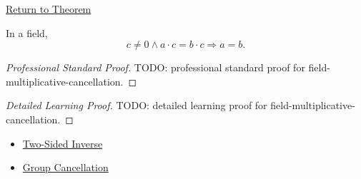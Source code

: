 \newpage
{}
\label{prf:field-multiplicative-cancellation}

\begin{remark*}[Return]
\hyperref[thm:field-multiplicative-cancellation]{Return to Theorem}
\end{remark*}

\begin{theorem*}
In a field,
\[
c\ne0\land a\cdot c=b\cdot c
\Longrightarrow
a=b.
\]
\end{theorem*}

\begin{proof}[Professional Standard Proof]
\LRAProofBodyStart
TODO: professional standard proof for field-multiplicative-cancellation.
\end{proof}

\begin{proof}[Detailed Learning Proof]
\LRAProofBodyStart
TODO: detailed learning proof for field-multiplicative-cancellation.
\end{proof}

\begin{remark*}
\end{remark*}

\begin{dependencies}
\begin{itemize}
  \item \hyperref[def:two-sided-inverse]{Two-Sided Inverse}
  \item \hyperref[thm:group-cancellation]{Group Cancellation}
\end{itemize}
\end{dependencies}

\clearpage
